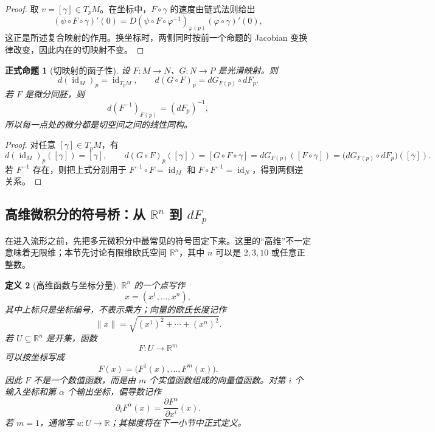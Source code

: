 \documentclass[UTF8,fontset=none,a4paper,11pt]{ctexart}
\theoremstyle{foundation-definition}
\newtheorem{definition}{定义}[section]
\theoremstyle{foundation-theorem}
\theoremstyle{foundation-proposition}
\newtheorem{proposition}[definition]{正式命题}
\theoremstyle{foundation-example}
\theoremstyle{foundation-remark}
\theoremstyle{foundation-theorem}
\begin{document}
\begin{proof}
取 \(v=[\gamma]\in T_pM\)。在坐标中，\(F\circ\gamma\) 的速度由链式法则给出
\[
(\psi\circ F\circ\gamma)'(0)
=D(\psi\circ F\circ\varphi^{-1})_{\varphi(p)}(\varphi\circ\gamma)'(0),
\]
这正是所述复合映射的作用。换坐标时，两侧同时按前一个命题的 Jacobian 变换律改变，因此内在的切映射不变。
\end{proof}

\begin{proposition}[切映射的函子性]\label{prop:differential-functoriality}
设 \(F:M\to N\)、\(G:N\to P\) 是光滑映射。则
\[
d(\operatorname{id}_M)_p=\operatorname{id}_{T_pM},
\qquad
d(G\circ F)_p=dG_{F(p)}\circ dF_p.
\]
若 \(F\) 是微分同胚，则
\[
d(F^{-1})_{F(p)}=(dF_p)^{-1},
\]
所以每一点处的微分都是切空间之间的线性同构。
\end{proposition}

\begin{proof}
对任意 \([\gamma]\in T_pM\)，有
\[
d(\operatorname{id}_M)_p([\gamma])=[\gamma],
\qquad
d(G\circ F)_p([\gamma])=[G\circ F\circ\gamma]
=dG_{F(p)}([F\circ\gamma])
=\bigl(dG_{F(p)}\circ dF_p\bigr)([\gamma]).
\]
若 \(F^{-1}\) 存在，则把上式分别用于 \(F^{-1}\circ F=\operatorname{id}_M\) 和
\(F\circ F^{-1}=\operatorname{id}_N\)，得到两侧逆关系。
\end{proof}

\subsection{\texorpdfstring{高维微积分的符号桥：从 \(\mathbb R^n\) 到 \(dF_p\)}{高维微积分的符号桥：从 Rn 到 dFp}}

在进入流形之前，先把多元微积分中最常见的符号固定下来。这里的“高维”不一定意味着无限维；本节先讨论有限维欧氏空间 \(\mathbb R^n\)，其中 \(n\) 可以是 \(2,3,10\) 或任意正整数。

\begin{definition}[高维函数与坐标分量]\label{def:multivariable-calculus}
\(\mathbb R^n\) 的一个点写作
\[
x=(x^1,\ldots,x^n),
\]
其中上标只是坐标编号，不表示乘方；向量的欧氏长度记作
\[
\|x\|=\sqrt{(x^1)^2+\cdots+(x^n)^2}.
\]
若 \(U\subseteq\mathbb R^n\) 是开集，函数
\[
F:U\longrightarrow\mathbb R^m
\]
可以按坐标写成
\[
F(x)=\bigl(F^1(x),\ldots,F^m(x)\bigr).
\]
因此 \(F\) 不是一个数值函数，而是由 \(m\) 个实值函数组成的向量值函数。对第 \(i\) 个输入坐标和第 \(\alpha\) 个输出坐标，偏导数记作
\[
\partial_iF^\alpha(x)=\frac{\partial F^\alpha}{\partial x^i}(x).
\]
若 \(m=1\)，通常写 \(u:U\to\mathbb R\)；其梯度将在下一小节中正式定义。
\end{definition}
\end{document}
